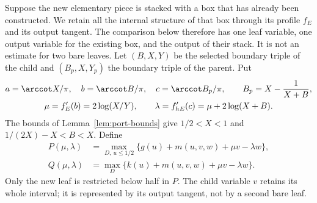 Suppose the new elementary piece is stacked with a box that has already been constructed. We retain all the internal structure of that box through its profile $f_E$ and its output tangent. The comparison below therefore has one leaf variable, one output variable for the existing box, and the output of their stack. It is not an estimate for two bare leaves.
Let $(B,X,Y)$ be the selected boundary triple of the child and $(B_p,X,Y_p)$ the boundary triple of the parent. Put
\begin{equation}\label{eq:attachment-slopes}
 \begin{gathered}
 a=\arccot X/\pi,\quad b=\arccot B/\pi,\quad
 c=\arccot B_p/\pi,\qquad B_p=X-\frac1{X+B},\\
 \mu=f_E'(b)=2\log(X/Y),\qquad
 \lambda=f_{hE}'(c)=\mu+2\log(X+B).
 \end{gathered}
\end{equation}
The bounds of Lemma~\ref{lem:port-bounds} give $1/2<X<1$ and $1/(2X)-X<B<X$. Define
\begin{align}
 P(\mu,\lambda)&=\max_{D,\ u\le1/2}
       \{g(u)+m(u,v,w)+\mu v-\lambda w\},\label{eq:single-P}\\
 Q(\mu,\lambda)&=\max_D
       \{k(u)+m(u,v,w)+\mu v-\lambda w\}.\label{eq:single-Q}
\end{align}
Only the new leaf is restricted below half in $P$. The child variable $v$ retains its whole interval; it is represented by its output tangent, not by a second bare leaf.

